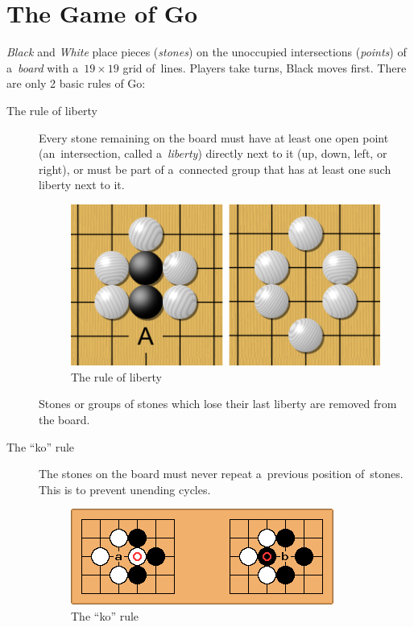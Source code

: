 \section{The Game of Go}
\label{sec:Go}

\emph{Black} and \emph{White} place pieces (\emph{stones}) on the unoccupied intersections (\emph{points}) of a~\emph{board} with a~$19\times19$ grid of~lines.
Players take turns, Black moves first.
There are only 2 basic rules of Go:
\begin{description}
  \item [The rule of liberty]
    Every stone remaining on the board must have at least one open point (an~intersection, called a~\emph{liberty}) directly next to it (up, down, left, or right), or must be part of a~connected group that has at least one such liberty next to it.
    \begin{figure}[H]
      \centering
      \includegraphics[width=.5\textwidth]{../img/Go_rule_of_liberty.png}
      \caption{The rule of liberty}
      \label{fig:Go-rule-liberty}
    \end{figure}

    Stones or groups of stones which lose their last liberty are removed from the board.

  \item [The ``ko'' rule]
    The stones on the board must never repeat a~previous position of~stones.
    This is to prevent unending cycles.
    \begin{figure}[H]
      \centering
      \includegraphics[width=.5\textwidth]{../img/Go_ko_rule.png}
      \caption{The ``ko'' rule}
      \label{fig:Go-Ko-rule}
    \end{figure}
\end{description}

